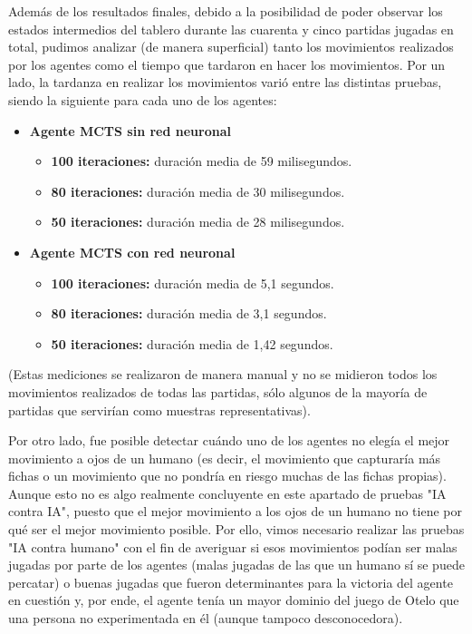 \documentclass[conference]{IEEEtran}
\begin{document}
Además de los resultados finales, debido a la posibilidad de poder observar los estados intermedios del tablero durante las cuarenta y cinco partidas jugadas en total, pudimos analizar (de manera superficial) tanto los movimientos realizados por los agentes como el tiempo que tardaron en hacer los movimientos. Por un lado, la tardanza en realizar los movimientos varió entre las distintas pruebas, siendo la siguiente para cada uno de los agentes:

\begin{itemize}
    \item \textbf{Agente MCTS sin red neuronal}
    \begin{itemize}
    	\item \textbf{100 iteraciones:} duración media de 59 milisegundos.
    	\item \textbf{80 iteraciones:} duración media de 30 milisegundos.
	\item \textbf{50 iteraciones:} duración media de 28 milisegundos.
    \end{itemize}
    \item \textbf{Agente MCTS con red neuronal}
    \begin{itemize}
    	\item \textbf{100 iteraciones:} duración media de 5,1 segundos.
    	\item \textbf{80 iteraciones:} duración media de 3,1 segundos.
	\item \textbf{50 iteraciones:} duración media de 1,42 segundos.
    \end{itemize}
\end{itemize}

(Estas mediciones se realizaron de manera manual y no se midieron todos los movimientos realizados de todas las partidas, sólo algunos de la mayoría de partidas que servirían como muestras representativas).

Por otro lado, fue posible detectar cuándo uno de los agentes no elegía el mejor movimiento a ojos de un humano (es decir, el movimiento que capturaría más fichas o un movimiento que no pondría en riesgo muchas de las fichas propias). Aunque esto no es algo realmente concluyente en este apartado de pruebas "IA contra IA", puesto que el mejor movimiento a los ojos de un humano no tiene por qué ser el mejor movimiento posible. Por ello, vimos necesario realizar las pruebas "IA contra humano" con el fin de averiguar si esos movimientos podían ser malas jugadas por parte de los agentes (malas jugadas de las que un humano sí se puede percatar) o buenas jugadas que fueron determinantes para la victoria del agente en cuestión y, por ende, el agente tenía un mayor dominio del juego de Otelo que una persona no experimentada en él (aunque tampoco desconocedora).
\end{document}
